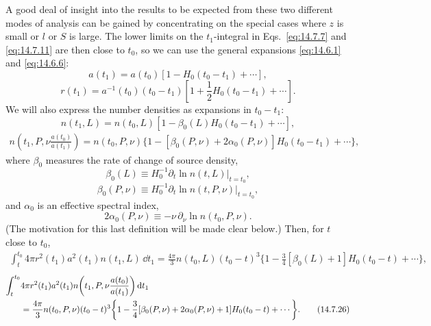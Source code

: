 A good deal of insight into the results to be expected from these two
different modes of analysis can be gained by concentrating on the special
cases where \(z\) is small or \(l\) or \(S\) is large. The lower limits on
the \(t_1\)-integral in Eqs.~\eqref{eq:14.7.7} and \eqref{eq:14.7.11} are
then close to \(t_0\), so we can use the general expansions
\eqref{eq:14.6.1} and \eqref{eq:14.6.6}:
\[
  a(t_1)
  =
  a(t_0)
  \left[
    1-H_0(t_0-t_1)+\cdots
  \right],
\]
\[
  r(t_1)
  =
  a^{-1}(t_0)(t_0-t_1)
  \left[
    1+\frac12H_0(t_0-t_1)+\cdots
  \right].
\]
We will also express the number densities as expansions in \(t_0-t_1\):
\begin{equation}
  n(t_1,L)
  =
  n(t_0,L)
  \left[
    1-\beta_0(L)H_0(t_0-t_1)+\cdots
  \right],
  \tag{14.7.20}\label{eq:14.7.20}
\end{equation}
\begin{align}
  n\!\left(
    t_1,P,\nu\frac{a(t_0)}{a(t_1)}
  \right)
  =
  n(t_0,P,\nu)
  \bigl\{
    1
    -[\beta_0(P,\nu)+2\alpha_0(P,\nu)]
    H_0(t_0-t_1)
    +\cdots
  \bigr\},
  \tag{14.7.21}\label{eq:14.7.21}
\end{align}
where \(\beta_0\) measures the rate of change of source density,
\begin{equation}
  \beta_0(L)
  \equiv
  H_0^{-1}
  \left.
    \partial_t\ln n(t,L)
  \right|_{t=t_0},
  \tag{14.7.22}\label{eq:14.7.22}
\end{equation}
\begin{equation}
  \beta_0(P,\nu)
  \equiv
  H_0^{-1}
  \left.
    \partial_t\ln n(t,P,\nu)
  \right|_{t=t_0},
  \tag{14.7.23}\label{eq:14.7.23}
\end{equation}
and \(\alpha_0\) is an effective spectral index,
\begin{equation}
  2\alpha_0(P,\nu)
  \equiv
  -\nu\,\partial_\nu\ln n(t_0,P,\nu).
  \tag{14.7.24}\label{eq:14.7.24}
\end{equation}
(The motivation for this last definition will be made clear below.) Then,
for \(t\) close to \(t_0\),
\begin{align}
  \int_t^{t_0}
  4\pi r^2(t_1)a^2(t_1)n(t_1,L)\,\dd t_1
  =
  \frac{4\pi}{3}n(t_0,L)(t_0-t)^3
  \biggl\{
    1
    -\frac34[\beta_0(L)+1]H_0(t_0-t)
    +\cdots
  \biggr\},
  \tag{14.7.25}\label{eq:14.7.25}
\end{align}
\begin{align}
  \int_t^{t_0}
  &4\pi r^2(t_1)a^2(t_1)
  n\!\left(
    t_1,P,\nu\frac{a(t_0)}{a(t_1)}
  \right)
  \mathop{}\!\mathrm{d} t_1
  \notag\\
  &=
  \frac{4\pi}{3}n(t_0,P,\nu)(t_0-t)^3
  \biggl\{
    1
    -\frac34[
      \beta_0(P,\nu)+2\alpha_0(P,\nu)+1
    ]H_0(t_0-t)
    +\cdots
  \biggr\}.
  \tag{14.7.26}\label{eq:14.7.26}
\end{align}

